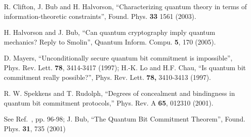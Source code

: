 \documentclass[pra,twocolumn,nofootinbib,showpacs]{revtex4}
\begin{document}
\begin{thebibliography}{99}
 R. Clifton, J. Bub and H. Halvorson, ``Characterizing quantum
theory in terms of information-theoretic constraints'', Found.
Phys. \textbf{33} 1561 (2003).


 H. Halvorson and J. Bub, ``Can quantum cryptography
imply quantum mechanics? Reply to Smolin'', Quantum Inform. Compu.
\textbf{5}, 170 (2005).

 D. Mayers, ``Unconditionally secure quantum bit
commitment is impossible'', Phys. Rev. Lett. \textbf{78}, 3414-3417 (1997);
H.-K. Lo and H.F. Chau, ``Is quantum bit commitment really possible?'',
Phys. Rev. Lett. \textbf{78,} 3410-3413 (1997).

 R. W. Spekkens and T. Rudolph, ``Degrees of
concealment and bindingness in quantum bit commitment protocols,'' Phys.
Rev. A \textbf{65}, 012310 (2001).

 See Ref.~\cite{Fuchssamizdat}, pp. 96-98; J. Bub,
``The Quantum Bit Commitment Theorem'', Found. Phys. \textbf{31}, 735 (2001)
\end{thebibliography}
\end{document}
